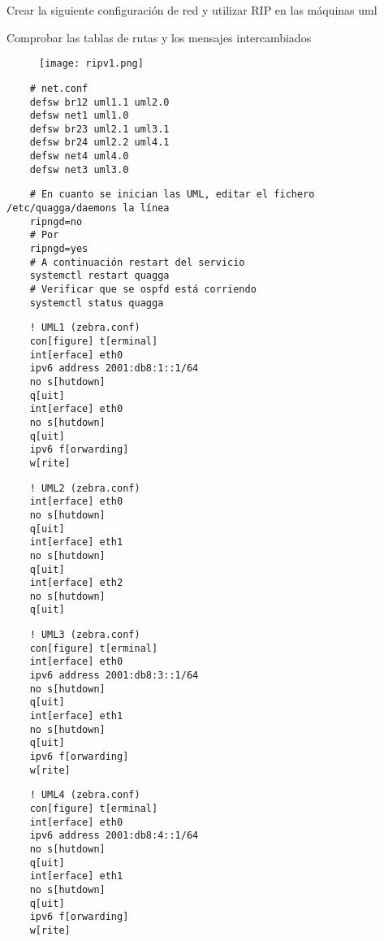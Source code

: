Crear la siguiente configuración de red y utilizar RIP en las
máquinas uml

Comprobar las tablas de rutas y los mensajes intercambiados

  \begin{figure}[h]
    \texttt{[image: ripv1.png]}
    \centering
  \end{figure}

  \begin{verbatim}
    # net.conf
    defsw br12 uml1.1 uml2.0
    defsw net1 uml1.0
    defsw br23 uml2.1 uml3.1
    defsw br24 uml2.2 uml4.1
    defsw net4 uml4.0
    defsw net3 uml3.0
  \end{verbatim}
  
  \begin{verbatim}
    # En cuanto se inician las UML, editar el fichero /etc/quagga/daemons la línea
    ripngd=no
    # Por
    ripngd=yes
    # A continuación restart del servicio
    systemctl restart quagga
    # Verificar que se ospfd está corriendo
    systemctl status quagga
\end{verbatim}
  
  \begin{verbatim}
    ! UML1 (zebra.conf)
    con[figure] t[erminal]
    int[erface] eth0
    ipv6 address 2001:db8:1::1/64
    no s[hutdown]
    q[uit]
    int[erface] eth0
    no s[hutdown]
    q[uit]
    ipv6 f[orwarding]
    w[rite]
  \end{verbatim}
  
  \begin{verbatim}
    ! UML2 (zebra.conf)
    int[erface] eth0
    no s[hutdown]
    q[uit]
    int[erface] eth1
    no s[hutdown]
    q[uit]
    int[erface] eth2
    no s[hutdown]
    q[uit]
  \end{verbatim}
  
  \begin{verbatim}
    ! UML3 (zebra.conf)
    con[figure] t[erminal]
    int[erface] eth0
    ipv6 address 2001:db8:3::1/64
    no s[hutdown]
    q[uit]
    int[erface] eth1
    no s[hutdown]
    q[uit]
    ipv6 f[orwarding]
    w[rite]
  \end{verbatim}
  
  \begin{verbatim}
    ! UML4 (zebra.conf)
    con[figure] t[erminal]
    int[erface] eth0
    ipv6 address 2001:db8:4::1/64
    no s[hutdown]
    q[uit]
    int[erface] eth1
    no s[hutdown]
    q[uit]
    ipv6 f[orwarding]
    w[rite]
  \end{verbatim}
  
